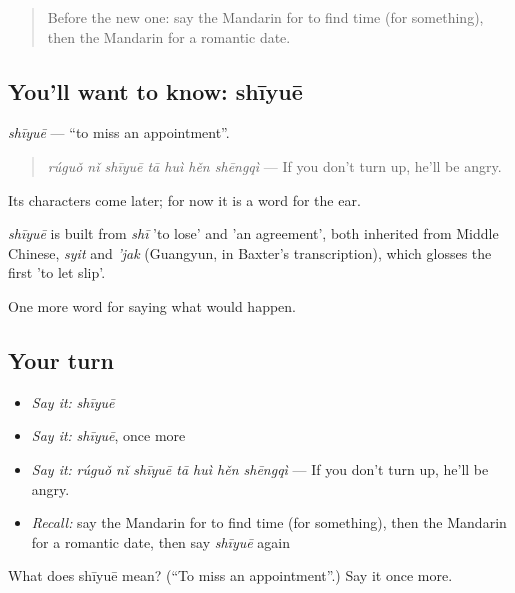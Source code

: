 \begin{quote}
Before the new one: say the Mandarin for to find time (for something), then the Mandarin for a romantic date.
\end{quote}

\subsection*{You'll want to know: shīyuē}
\emph{shīyuē} — \textquotedblleft{}to miss an appointment\textquotedblright{}.

\begin{quote}
\emph{rúguǒ nǐ shīyuē tā huì hěn shēngqì} — If you don't turn up, he'll be angry.
\end{quote}

Its characters come later; for now it is a word for the ear.

\begin{cousinweb}
\emph{shīyuē} is built from \emph{shī} 'to lose' and  'an agreement', both inherited from Middle Chinese, \emph{syit} and \emph{'jak} (Guangyun, in Baxter's transcription), which glosses the first 'to let slip'.
\end{cousinweb}

\begin{grammarlens}[title={What you've built}]
One more word for saying what would happen.
\end{grammarlens}

\subsection*{Your turn}
\begin{itemize}
\raggedright
  \item \emph{Say it:} \emph{shīyuē}
  \item \emph{Say it:} \emph{shīyuē}, once more
  \item \emph{Say it:} \emph{rúguǒ nǐ shīyuē tā huì hěn shēngqì} — If you don't turn up, he'll be angry.
  \item \emph{Recall:} say the Mandarin for to find time (for something), then the Mandarin for a romantic date, then say \emph{shīyuē} again
\end{itemize}

\begin{tcolorbox}[breakable,colback=teal!4,colframe=teal!35!black,title={Before you move on}]
What does shīyuē mean? (\textquotedblleft{}To miss an appointment\textquotedblright{}.) Say it once more.
\end{tcolorbox}
